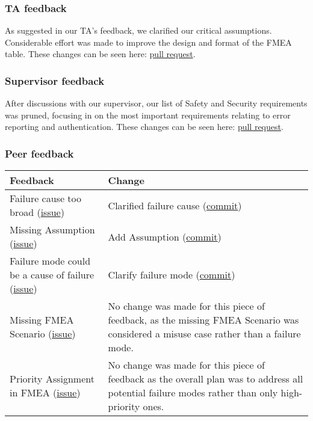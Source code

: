 \documentclass{article}
\begin{document}
\subsubsection{TA feedback}
As suggested in our TA's feedback, we clarified our critical assumptions. Considerable effort was made to improve the design and format of the FMEA table. These changes can be seen here: \href{https://github.com/AidanMariglia/SOCAlgoTestPlatform/pull/175}{pull request}.
\subsubsection{Supervisor feedback}
After discussions with our supervisor, our list of Safety and Security requirements was pruned, focusing in on the most important requirements relating to error reporting and authentication. These changes can be seen here: \href{https://github.com/AidanMariglia/SOCAlgoTestPlatform/pull/175}{pull request}.
\subsubsection{Peer feedback}
\begin{tabularx}{\textwidth}{X|X}
\toprule
\textbf{Feedback} & \textbf{Change}\\
\midrule
Failure cause too broad
(\href{https://github.com/AidanMariglia/SOCAlgoTestPlatform/issues/19}{issue}) &
Clarified failure cause
(\href{https://github.com/AidanMariglia/SOCAlgoTestPlatform/pull/62}{commit}) \\
\midrule
Missing Assumption
(\href{https://github.com/AidanMariglia/SOCAlgoTestPlatform/issues/17}{issue}) &
Add Assumption
(\href{https://github.com/AidanMariglia/SOCAlgoTestPlatform/pull/61}{commit}) \\
\midrule
Failure mode could be a cause of failure
(\href{https://github.com/AidanMariglia/SOCAlgoTestPlatform/issues/18}{issue}) &
Clarify failure mode
(\href{https://github.com/AidanMariglia/SOCAlgoTestPlatform/pull/65}{commit}) \\
\midrule
Missing FMEA Scenario
(\href{https://github.com/AidanMariglia/SOCAlgoTestPlatform/issues/16}{issue}) &
No change was made for this piece of feedback, as the missing FMEA Scenario was considered a misuse case rather than a failure mode. \\
\midrule
Priority Assignment in FMEA
(\href{https://github.com/AidanMariglia/SOCAlgoTestPlatform/issues/20}{issue}) &
No change was made for this piece of feedback as the overall plan was to address all potential failure modes rather than only high-priority ones. \\
\bottomrule
\end{tabularx}
\end{document}
